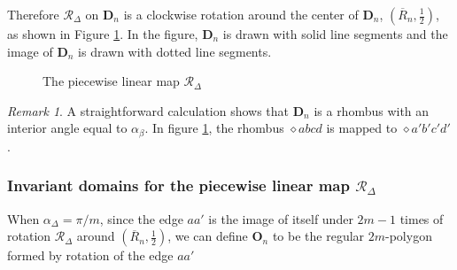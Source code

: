 \documentclass{article}
\numberwithin{figure}{section}
\numberwithin{equation}{section}
\theoremstyle{remark}
\newtheorem*{remark}{Remark}
\theoremstyle{definition}
\begin{document}
Therefore $\mathcal{R}_\Delta$ on	$\textbf{D}_n$ is a clockwise rotation around the center of $\textbf{D}_n$, $\left(\overline{R}_n,\frac{1}{2}\right)$, as shown in Figure \ref * {rotation}. In the figure, $\textbf{D}_n$ is drawn with solid line segments and the image of $\textbf{D}_n$ is drawn with dotted line segments.
\begin{figure}[H]
	\centering
	\caption{The piecewise linear map $\mathcal{R}_\Delta$}
	\label{rotation}
\end{figure}
\begin{remark}
	A straightforward calculation shows that $\textbf{D}_n$ is a rhombus with an interior angle equal to $\alpha_\beta$. In figure \ref*{rotation}, the rhombus $\diamond abcd$ is mapped to $\diamond a'b'c'd'$.
\end{remark}

\subsubsection{Invariant domains for the piecewise linear map \texorpdfstring{$\mathcal{R}_\Delta$}{TEXT}}
When $\alpha_\Delta=\pi/m$, since the edge $aa'$ is the image of itself under $2m-1$ times of rotation $\mathcal{R}_\Delta$ around $\left(\overline{R}_n,\frac{1}{2}\right)$, we can define $\textbf{O}_n$ to be the regular $2m$-polygon formed by rotation of the edge $aa'$
\end{document}
